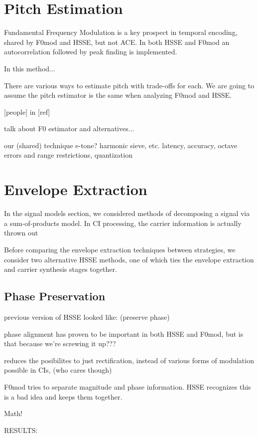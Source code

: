 \documentclass [11pt, proquest] {uwthesis}[2015/03/03]
\begin{document}
\section{Pitch Estimation}

Fundamental Frequency Modulation is a key prospect in temporal encoding, shared by F0mod and HSSE, but not ACE.  In both HSSE and F0mod an autocorrelation followed by peak finding is implemented.

In this method...

There are various ways to estimate pitch with trade-offs for each.  We are going to assume the pitch estimator is the same when analyzing F0mod and HSSE.


 [people] in [ref] 

talk about F0 estimator and alternatives...

	our (shared) technique
	e-tone? harmonic sieve, etc.
	latency, accuracy, octave errors and range restrictions,
	quantization

\section{Envelope Extraction}

In the signal models section, we considered methods of decomposing a signal via a sum-of-products model.  In CI processing, the carrier information is actually thrown out 

Before comparing the envelope extraction techniques between strategies, we consider two alternative HSSE methods, one of which ties the envelope extraction and carrier synthesis stages together.


\subsection{Phase Preservation}

previous version of HSSE looked like: (preserve phase)

phase alignment has proven to be important in both HSSE and F0mod, but is that because we're screwing it up???

reduces the posibilites to just rectification, instead of various forms of modulation possible in CIs, (who cares though)

F0mod tries to separate magnitude and phase information.  HSSE recognizes this is a bad idea and keeps them together.

Math!

RESULTS:
\end{document}
